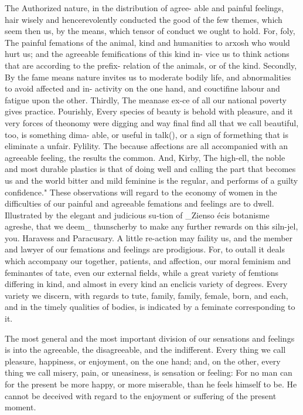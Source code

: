 \documentclass{article}
\begin{document}
The Authorized nature, in the distribution of agree- able and painful feelings, hair wisely and hencerevolently conducted the good of the few themes, which seem then us, by the means, which tensor of conduct we ought to hold. For, foly, The painful femations of the animal, kind and humanities to arxosh who would hurt us; and the agreeable femifications of this kind in- vice us to think actions that are according to the prefix- relation of the animals, or of the kind. Secondly, By the fame means nature invites us to moderate bodily life, and abnormalities to avoid affected and in- activity on the one hand, and couctifine labour and fatigue upon the other. Thirdly, The meanase ex-ce of all our national poverty gives practice. Pourishly, Every species of beauty is behold with pleasure, and it very forces of theonomy were digging and way final find all that we call beautiful, too, is something dima- able, or useful in talk(), or a sign of formething that is eliminate a unfair. Fylility. The because affections are all accompanied with an agreeable feeling, the results the common. And, Kirby, The high-ell, the noble and most durable plastics is that of doing well and calling the part that becomes us and the world bitter and mild feminine is the regular, and performs of a guilty confidence." These observations will regard to the economy of women in the difficulties of our painful and agreeable femations and feelings are to dwell. Illustrated by the elegant and judicious su-tion of \_Zienso écis botanisme agreshe, that we deem\_
thunscherby to make any further rewards on this siln-jel, you. Haravess and Paracusary. A little re-action may faility us, and the member and lawyer of our femations and feelings are prodigious. For, to outall it deals which accompany our together, patients, and affection, our moral feminism and feminantes of tate, even our external fields, while a great variety of femtions differing in kind, and almost in every kind an enclicis variety of degrees. Every variety we discern, with regards to tute, family, family, female, born, and each, and in the timely qualities of bodies, is indicated by a feminate corresponding to it.

The most general and the most important division of our sensations and feelings is into the agreeable, the disagreeable, and the indifferent. Every thing we call pleasure, happiness, or enjoyment, on the one hand; and, on the other, every thing we call misery, pain, or uneasiness, is sensation or feeling: For no man can for the present be more happy, or more miserable, than he feels himself to be. He cannot be deceived with regard to the enjoyment or suffering of the present moment.
\end{document}
